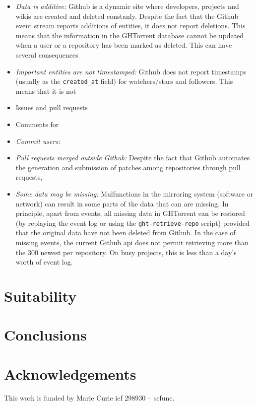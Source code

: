 \documentclass[conference]{IEEEtran}
\begin{document}
\begin{itemize}

  \item \emph{Data is additive:} Github is a dynamic site where developers, 
    projects and wikis are created and deleted constanly. Despite the fact
    that the Github event stream reports additions of entities, it does
    not report deletions. This means that the information in the GHTorrent 
    database cannot be updated when a user or a repository has been marked
    as deleted. This can have several consequences 

  \item \emph{Important entities are not timestamped:} Github does not
    report timestamps (usually as the \texttt{created\_at} field) for watchers/stars
    and followers. This means that it is not 

  \item Issues and pull requests

  \item Comments for  

  \item \emph{Commit users:}

  \item \emph{Pull requests merged outside Github:} Despite the fact that Github
    automates the generation and submission of patches among repositories
    through pull requests, 

  \item \emph{Some data may be missing:} 
    Mulfunctions in the mirroring system (software or network) can result in 
    some parts of the data that can are missing. In principle, apart from
    events, all missing data in GHTorrent can be restored (by replaying the
    event log or using the \texttt{ght-retrieve-repo} script) provided that the
    original data have not been deleted from Github. In the case of missing
    events, the current Github {\sc api} does not permit retrieving more than
    the 300 newest per repository. On busy projects, this is less than
    a day's worth of event log.

\end{itemize}

\section{Suitability}



\section{Conclusions}

\section*{Acknowledgements}
This work is funded by Marie Curie {\sc ief} 298930 -- {\sc sefunc}.



\end{document}
